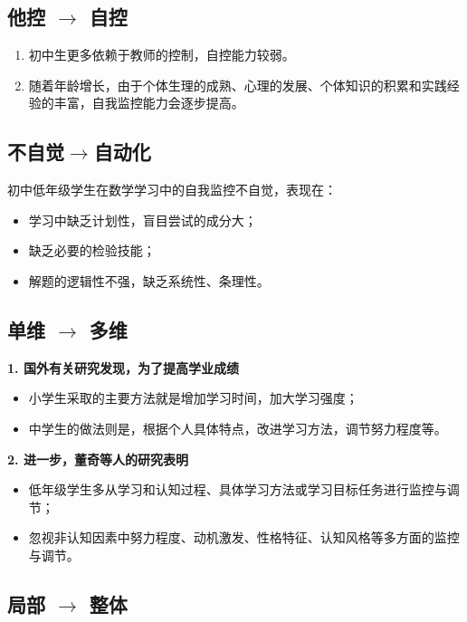 \begin{multicols}{2}
\subsection*{他控 $\rightarrow$ 自控}

\begin{enumerate}
    \item 初中生更多依赖于教师的控制，自控能力较弱。
    \item 随着年龄增长，由于个体生理的成熟、心理的发展、个体知识的积累和实践经验的丰富，自我监控能力会逐步提高。
\end{enumerate}

\subsection*{不自觉$\rightarrow$自动化}

初中低年级学生在数学学习中的自我监控不自觉，表现在：

\begin{itemize}
    \item 学习中缺乏计划性，盲目尝试的成分大；
    \item 缺乏必要的检验技能；
    \item 解题的逻辑性不强，缺乏系统性、条理性。
\end{itemize}
\columnbreak
\subsection*{单维 $\rightarrow$ 多维}

\textbf{1. 国外有关研究发现，为了提高学业成绩}
\begin{itemize}
    \item 小学生采取的主要方法就是增加学习时间，加大学习强度；
    \item 中学生的做法则是，根据个人具体特点，改进学习方法，调节努力程度等。
\end{itemize}

\textbf{2. 进一步，董奇等人的研究表明}
\begin{itemize}
    \item 低年级学生多从学习和认知过程、具体学习方法或学习目标任务进行监控与调节；
    \item 忽视非认知因素中努力程度、动机激发、性格特征、认知风格等多方面的监控与调节。
\end{itemize}
\end{multicols}
\clearpage
\subsection*{局部 $\rightarrow$ 整体}

